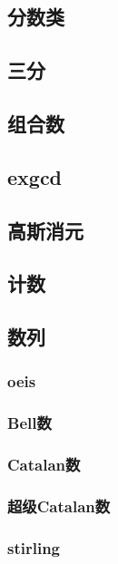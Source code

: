 \documentclass[10pt,a4paper]{article}
\begin{document}
\subsection{分数类}

\subsection{三分}

\subsection{组合数}

\subsection{exgcd}

\subsection{高斯消元}

\subsection{计数}
\begin{spacing}{1.5}

\end{spacing}
\subsection{数列}
\subsubsection{oeis}

\subsubsection{Bell数}

\subsubsection{Catalan数}

\subsubsection{超级Catalan数}

\subsubsection{stirling}

\end{document}
